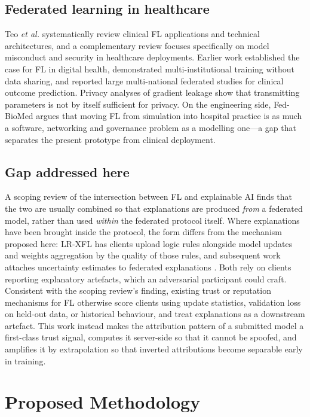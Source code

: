 \documentclass[conference]{IEEEtran}
\begin{document}
\subsection{Federated learning in healthcare}
Teo \emph{et al.} \cite{teo2024fl} systematically review clinical FL
applications and technical architectures, and a complementary review
\cite{ali2024flhealth} focuses specifically on model misconduct and security
in healthcare deployments. Earlier work established the case
for FL in digital health, demonstrated multi-institutional training without
data sharing, and reported large multi-national federated studies for clinical
outcome prediction. Privacy analyses of gradient leakage show that
transmitting parameters is not by itself sufficient for privacy. On the engineering side, Fed-BioMed
\cite{cremonesi2023fedbiomed} argues that moving FL from simulation into
hospital practice is as much a software, networking and governance problem as
a modelling one---a gap that separates the present prototype from clinical
deployment.

\subsection{Gap addressed here}
A scoping review of the intersection between FL and explainable AI
\cite{lopezramos2024} finds that the two are usually combined so that
explanations are produced \emph{from} a federated model, rather than used
\emph{within} the federated protocol itself. Where explanations have been
brought inside the protocol, the form differs from the mechanism proposed
here: LR-XFL \cite{zhang2024lrxfl} has clients upload logic rules alongside
model updates and weights aggregation by the quality of those rules, and
subsequent work attaches uncertainty estimates to federated explanations
\cite{zhang2025uncertainty}. Both rely on clients reporting explanatory
artefacts, which an adversarial participant could craft. Consistent with the
scoping review's finding, existing trust or reputation mechanisms for FL
otherwise score clients using update statistics, validation loss on held-out
data, or historical behaviour, and treat explanations as a downstream
artefact. This
work instead makes the attribution pattern of a submitted model a first-class
trust signal, computes it server-side so that it cannot be spoofed, and
amplifies it by extrapolation so that inverted attributions become
separable early in training.

\section{Proposed Methodology}
\end{document}
